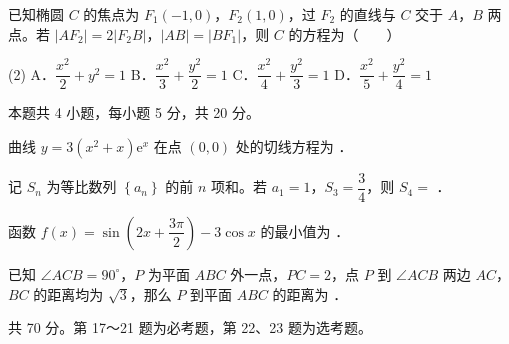 \begin{question}
已知椭圆 $C$ 的焦点为 $F_1(-1,0)$，$F_2(1,0)$，过 $F_2$ 的直线与 $C$ 交于 $A$，$B$ 两点。若 $\left|AF_2\right|=2\left|F_2B\right|$，$|AB|=\left|BF_1\right|$，则 $C$ 的方程为\mbox{（　　）}

\begin{gkopts}(2)
\task A．$\dfrac{x^{2}}2+y^{2}=1$
\task B．$\dfrac{x^{2}}3+\dfrac{y^{2}}2=1$
\task C．$\dfrac{x^{2}}4+\dfrac{y^{2}}3=1$
\task D．$\dfrac{x^{2}}5+\dfrac{y^{2}}4=1$
\end{gkopts}

\par\medskip

\end{question}

\begin{gktip}
本题共 4 小题，每小题 5 分，共 20 分。
\end{gktip}

\begin{question}
曲线 $y=3\left(x^{2}+x\right)\mathrm e^{x}$ 在点 $(0,0)$ 处的切线方程为 \gkblank{}．

\end{question}
\begin{question}
记 $S_n$ 为等比数列 $\left\{a_n\right\}$ 的前 $n$ 项和。若 $a_1=1$，$S_3=\dfrac34$，则 $S_4=$ \gkblank{}．

\end{question}
\begin{question}
函数 $f(x)=\sin\left(2x+\dfrac{3\pi}2\right)-3\cos x$ 的最小值为 \gkblank{}．

\end{question}
\begin{question}
已知 $\angle ACB=90^\circ$，$P$ 为平面 $ABC$ 外一点，$PC=2$，点 $P$ 到 $\angle ACB$ 两边 $AC$，$BC$ 的距离均为 $\sqrt3$，那么 $P$ 到平面 $ABC$ 的距离为 \gkblank{}．

\par\medskip

\end{question}

\begin{gktip}
共 70 分。第 17～21 题为必考题，第 22、23 题为选考题。
\end{gktip}


